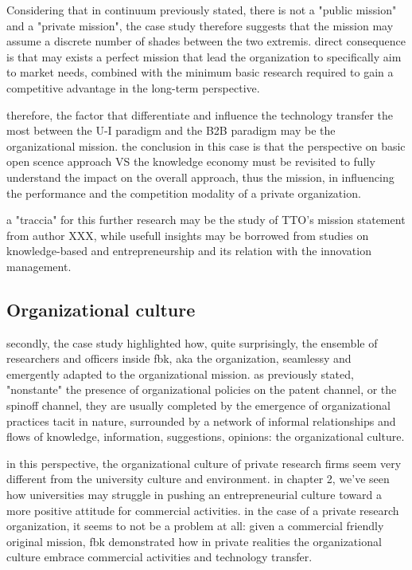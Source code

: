 Considering that in continuum previously stated, there is not a "public mission" and a "private mission", the case study therefore suggests that the mission may assume a discrete number of shades between the two extremis. direct consequence is that may exists a perfect mission that lead the organization to specifically aim to market needs, combined with the minimum basic research required to gain a competitive advantage in the long-term perspective. 

therefore, the factor that differentiate and influence the technology transfer the most between the U-I paradigm and the B2B paradigm may be the organizational mission. the conclusion in this case is that the perspective on basic open scence approach VS the knowledge economy must be revisited to fully understand the impact on the overall approach, thus the mission, in influencing the performance and the competition modality of a private organization. 

a "traccia" for this further research may be the study of TTO's mission statement from author XXX, while usefull insights may be borrowed from studies on knowledge-based and entrepreneurship and its relation with the innovation management.

\subsection{Organizational culture}

secondly, the case study highlighted how, quite surprisingly, the ensemble of researchers and officers inside fbk, aka the organization, seamlessy and emergently adapted to the organizational mission. as previously stated, "nonstante" the presence of organizational policies on the patent channel, or the spinoff channel, they are usually completed by the emergence of organizational practices tacit in nature, surrounded by a network of informal relationships and flows of knowledge, information, suggestions, opinions: the organizational culture.

in this perspective, the organizational culture of private research firms seem very different from the university culture and environment. in chapter 2, we've seen how universities may struggle in pushing an entrepreneurial culture toward a more positive attitude for commercial activities. in the case of a private research organization, it seems to not be a problem at all: given a commercial friendly original mission, fbk demonstrated how in private realities the organizational culture embrace commercial activities and technology transfer. 

